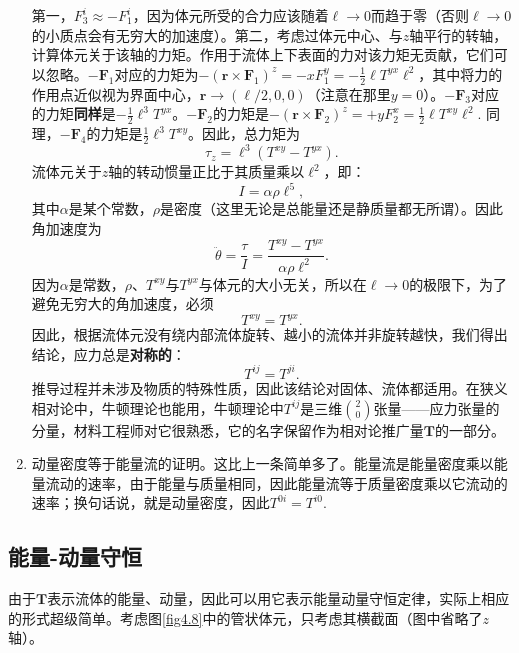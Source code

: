 \begin{enumerate}
    第一，$F_3^i \approx -F_1^i$，因为体元所受的合力应该随着$\ell \to 0$而趋于零（否则$\ell \to 0$的小质点会有无穷大的加速度）。第二，考虑过体元中心、与$z$轴平行的转轴，计算体元关于该轴的力矩。作用于流体上下表面的力对该力矩无贡献，它们可以忽略。$-\bm{F}_1$对应的力矩为$-(\bm{r} \times \bm{F}_1)^z = -x F_1^y = -\frac{1}{2}\ell T^{yx} \ell^2$，其中将力的作用点近似视为界面中心，$\bm{r} \to (\ell/2, 0, 0)$（注意在那里$y = 0$）。$-\bm{F}_3$对应的力矩\textbf{同样}是$-\frac{1}{2} \ell^3 T^{yx}$。$-\bm{F}_2$的力矩是$-(\bm{r} \times \bm{F}_2)^z = +yF_2^x = \frac{1}{2} \ell T^{xy} \ell^2$. 同理，$-\bm{F}_4$的力矩是$\frac{1}{2} \ell^3 T^{xy}$。因此，总力矩为
    \begin{equation}
        \tau_z = \ell^3 (T^{xy} - T^{yx}).
    \label{equ4.27}
    \end{equation}
    流体元关于$z$轴的转动惯量正比于其质量乘以$\ell^2$，即：
    \[
        I = \alpha \rho \ell^5,
    \]
    其中$\alpha$是某个常数，$\rho$是密度（这里无论是总能量还是静质量都无所谓）。因此角加速度为
    \begin{equation}
        \ddot{\theta} = \frac{\tau}{I} = \frac{T^{xy} - T^{yx}}{\alpha \rho \ell^2}.
    \label{equ4.28}
    \end{equation}
    因为$\alpha$是常数，$\rho$、$T^{xy}\text{与}T^{yx}$与体元的大小无关，所以在$\ell \to 0$的极限下，为了避免无穷大的角加速度，必须
    \[
        T^{xy} = T^{yx}.
    \]
    因此，根据流体元没有绕内部流体旋转、越小的流体并非旋转越快，我们得出结论，应力总是\textbf{对称的}：
    \begin{equation}    
        T^{ij} = T^{ji}.
    \label{equ4.29}
    \end{equation}  
    推导过程并未涉及物质的特殊性质，因此该结论对固体、流体都适用。在狭义相对论中，牛顿理论也能用，牛顿理论中$T^{ij}$是三维$\binom{2}{0}$张量——应力张量的分量，材料工程师对它很熟悉，它的名字保留作为相对论推广量$\mathbf{T}$的一部分。
    \item 动量密度等于能量流的证明。这比上一条简单多了。能量流是能量密度乘以能量流动的速率，由于能量与质量相同，因此能量流等于质量密度乘以它流动的速率；换句话说，就是动量密度，因此$T^{0i} = T^{i0}$.    
\end{enumerate}


\subsection*{能量-动量守恒}
由于$\mathbf{T}$表示流体的能量、动量，因此可以用它表示能量动量守恒定律，实际上相应的形式超级简单。考虑图\ref{fig4.8}中的管状体元，只考虑其横截面（图中省略了$z$轴）。

